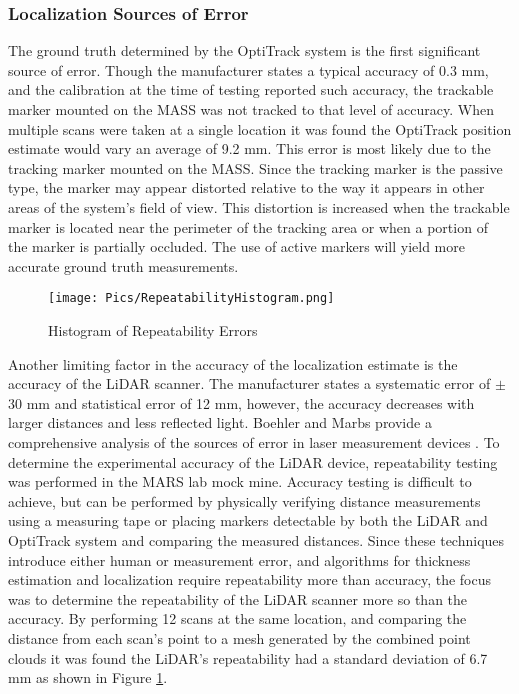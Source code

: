 \subsubsection{Localization Sources of Error}
\label{sec:locsourceerror}

The ground truth determined by the OptiTrack system is the first significant source of error. Though the manufacturer states a typical accuracy of 0.3 mm, and the calibration at the time of testing reported such accuracy, the trackable marker mounted on the MASS was not tracked to that level of accuracy. When multiple scans were taken at a single location it was found the OptiTrack position estimate would vary an average of 9.2 mm. This error is most likely due to the tracking marker mounted on the MASS. Since the  tracking marker is the passive type, the marker may appear distorted relative to the way it appears in other areas of the system's field of view. This distortion is increased when the trackable marker is located near the perimeter of the tracking area or when a portion of the marker is partially occluded. The use of active markers will yield more accurate ground truth measurements.\\

\begin{figure}
    \centering
    \texttt{[image: Pics/RepeatabilityHistogram.png]}
    \caption{Histogram of Repeatability Errors}
    \label{fig:repeathist}
\end{figure}

Another limiting factor in the accuracy of the localization estimate is the accuracy of the LiDAR scanner. The manufacturer states a systematic error of $\pm$30 mm and statistical error of 12 mm, however, the accuracy decreases with larger distances and less reflected light. Boehler and Marbs provide a comprehensive analysis of the sources of error in laser measurement devices \cite{checkthebookmarsbar}. To determine the experimental accuracy of the LiDAR device, repeatability testing was performed in the MARS lab mock mine. Accuracy testing is difficult to achieve, but can be performed by physically verifying distance measurements using a measuring tape or placing markers detectable by both the LiDAR and OptiTrack system and comparing the measured distances. Since these techniques introduce either human or measurement error, and algorithms for thickness estimation and localization require repeatability more than accuracy, the focus was to determine the repeatability of the LiDAR scanner more so than the accuracy. By performing 12 scans at the same location, and comparing the distance from each scan's point to a mesh generated by the combined point clouds it was found the LiDAR's repeatability had a standard deviation of 6.7 mm as shown in Figure \ref{fig:repeathist}.\\

